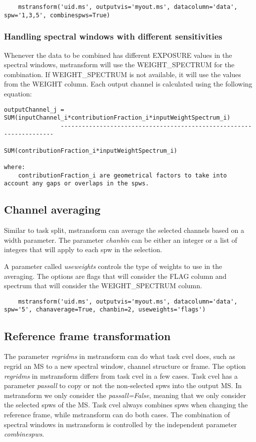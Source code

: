 \begin{verbatim}
    mstransform('uid.ms', outputvis='myout.ms', datacolumn='data', spw='1,3,5', combinespws=True)
\end{verbatim}

\subsubsection{Handling spectral windows with different sensitivities}
Whenever the data to be combined has different EXPOSURE values in the spectral
windows, mstransform will use the WEIGHT\_SPECTRUM for the combination. If
WEIGHT\_SPECTRUM is not available, it will use the values from the WEIGHT
column. Each output channel is calculated using the following equation:

\begin{verbatim}
outputChannel_j = SUM(inputChannel_i*contributionFraction_i*inputWeightSpectrum_i) 
                --------------------------------------------------------------------
                        SUM(contributionFraction_i*inputWeightSpectrum_i)

where:
    contributionFraction_i are geometrical factors to take into account any gaps or overlaps in the spws.
\end{verbatim}

\subsection{Channel averaging}
Similar to task split, mstransform can average the selected channels based on a
width parameter. The parameter {\it chanbin} can be either an integer or a list of
integers that will apply to each spw in the selection.

A parameter called {\it useweights} controls the type of weights to use in the
averaging. The options are flags that will consider the FLAG column and spectrum
that will consider the WEIGHT_SPECTRUM column.

\begin{verbatim}
    mstransform('uid.ms', outputvis='myout.ms', datacolumn='data', spw='5', chanaverage=True, chanbin=2, useweights='flags')
\end{verbatim}

\subsection{Reference frame transformation}
The parameter {\it regridms} in mstransform can do what task cvel does, such as
regrid an MS to a new spectral window, channel structure or frame. The option {\it regridms}
in mstransform differs from task cvel in a few cases. Task cvel has a
parameter {\it passall} to copy or not the non-selected spws into the output MS. In 
mstransform we only consider the {\it passall=False}, meaning that we only consider the
selected spws of the MS. Task cvel always combines spws when changing the reference
frame, while mstransform can do both cases. The combination of spectral windows in mstransform
is controlled by the independent parameter {\it combinespws}.

